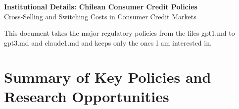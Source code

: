 \documentclass[12pt]{article}
\theoremstyle{plain}
\theoremstyle{plain}
\theoremstyle{definition}  %
\theoremstyle{remark}  %
\begin{document}
\begin{center}
    {\Large \textbf{Institutional Details: Chilean Consumer Credit Policies}} \\[6pt]
    Cross-Selling and Switching Costs in Consumer Credit Markets
\end{center}

\bigskip

\noindent This document takes the major regulatory policies from the files gpt1.md to gpt3.md and claude1.md and keeps only the ones I am interested in. 


\tableofcontents
 

\section{Summary of Key Policies and Research Opportunities}
\end{document}
